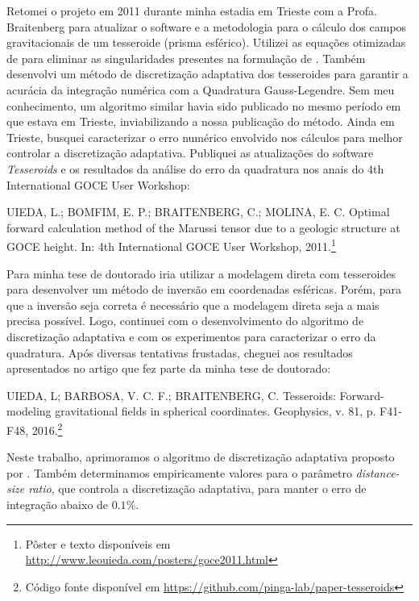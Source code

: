 Retomei o projeto em 2011 durante minha estadia em Trieste com a Profa.
Braitenberg para atualizar o software e a metodologia para o cálculo dos campos
gravitacionais de um tesseroide (prisma esférico).
Utilizei as equações otimizadas de \citet{grombein2013} para eliminar
as singularidades presentes na formulação de \citet{wild-pfeiffer2008}.
Também desenvolvi um método de discretização adaptativa dos tesseroides para
garantir a acurácia da integração numérica com a Quadratura Gauss-Legendre.
Sem meu conhecimento, um algoritmo similar \citep{li2011} havia sido publicado
no mesmo período em que estava em Trieste, inviabilizando a nossa publicação do
método.
Ainda em Trieste, busquei caracterizar o erro numérico envolvido
nos cálculos para melhor controlar a discretização adaptativa.
Publiquei as atualizações do software \textit{Tesseroids} e os resultados da
análise do erro da quadratura nos anais do 4th International GOCE User
Workshop:

\begin{displayquote}
    UIEDA, L.; BOMFIM, E. P.; BRAITENBERG, C.; MOLINA, E. C. Optimal
    forward calculation method of the Marussi tensor due to a geologic
    structure at GOCE height. In: 4th International GOCE User Workshop,
    2011.\footnote{Pôster e texto disponíveis em
    \url{http://www.leouieda.com/posters/goce2011.html}}
\end{displayquote}

Para minha tese de doutorado iria utilizar a modelagem direta com tesseroides
para desenvolver um método de inversão em coordenadas esféricas.
Porém, para que a inversão seja correta é necessário que a modelagem direta
seja a mais precisa possível.
Logo, continuei com o desenvolvimento do algoritmo de discretização adaptativa
e com os experimentos para caracterizar o erro da quadratura.
Após diversas tentativas frustadas, cheguei aos resultados apresentados no
artigo que fez parte da minha tese de doutorado:

\begin{displayquote}
    UIEDA, L; BARBOSA, V. C. F.; BRAITENBERG, C. Tesseroids:
    Forward-modeling gravitational fields in spherical coordinates. Geophysics,
    v. 81, p. F41-F48, 2016.\footnote{Código fonte disponível em
    \url{https://github.com/pinga-lab/paper-tesseroids}}
\end{displayquote}

Neste trabalho, aprimoramos o algoritmo de discretização adaptativa proposto
por \citet{li2011}.
Também determinamos empiricamente valores para o parâmetro
\textit{distance-size ratio}, que controla a discretização adaptativa,
para manter o erro de integração abaixo de $0.1\%$.

